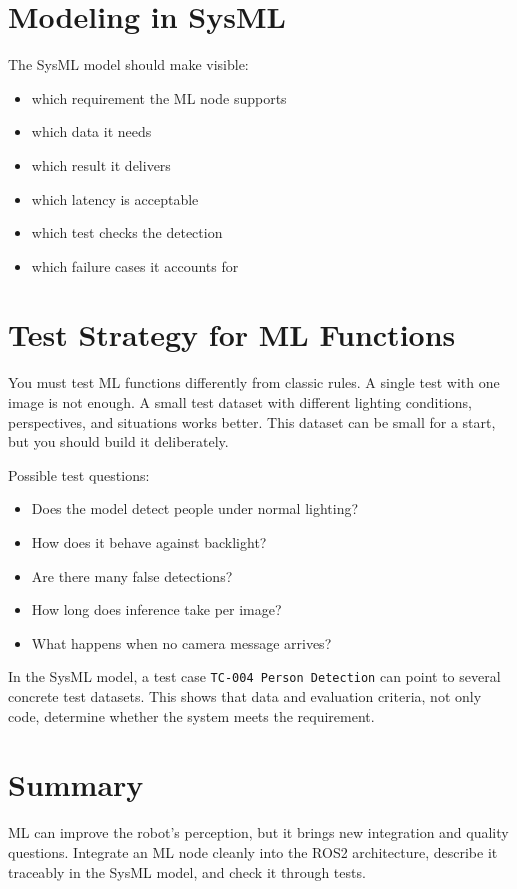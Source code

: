 \section{Modeling in SysML}
The SysML model should make visible:

\begin{itemize}
    \item which requirement the ML node supports
    \item which data it needs
    \item which result it delivers
    \item which latency is acceptable
    \item which test checks the detection
    \item which failure cases it accounts for
\end{itemize}

\section{Test Strategy for ML Functions}
You must test ML functions differently from classic rules. A single test with one image is not enough. A small test dataset with different lighting conditions, perspectives, and situations works better. This dataset can be small for a start, but you should build it deliberately.

Possible test questions:

\begin{itemize}
    \item Does the model detect people under normal lighting?
    \item How does it behave against backlight?
    \item Are there many false detections?
    \item How long does inference take per image?
    \item What happens when no camera message arrives?
\end{itemize}

In the SysML model, a test case \texttt{TC-004 Person Detection} can point to several concrete test datasets. This shows that data and evaluation criteria, not only code, determine whether the system meets the requirement.

\section{Summary}
ML can improve the robot's perception, but it brings new integration and quality questions. Integrate an ML node cleanly into the ROS2 architecture, describe it traceably in the SysML model, and check it through tests.

